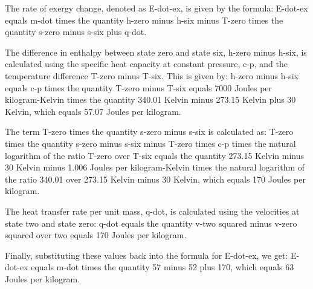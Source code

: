 The rate of exergy change, denoted as E-dot-ex, is given by the formula:
E-dot-ex equals m-dot times the quantity h-zero minus h-six minus T-zero times the quantity s-zero minus s-six plus q-dot.

The difference in enthalpy between state zero and state six, h-zero minus h-six, is calculated using the specific heat capacity at constant pressure, c-p, and the temperature difference T-zero minus T-six. This is given by:
h-zero minus h-six equals c-p times the quantity T-zero minus T-six equals 7000 Joules per kilogram-Kelvin times the quantity 340.01 Kelvin minus 273.15 Kelvin plus 30 Kelvin, which equals 57.07 Joules per kilogram.

The term T-zero times the quantity s-zero minus s-six is calculated as:
T-zero times the quantity s-zero minus s-six minus T-zero times c-p times the natural logarithm of the ratio T-zero over T-six equals the quantity 273.15 Kelvin minus 30 Kelvin minus 1.006 Joules per kilogram-Kelvin times the natural logarithm of the ratio 340.01 over 273.15 Kelvin minus 30 Kelvin, which equals 170 Joules per kilogram.

The heat transfer rate per unit mass, q-dot, is calculated using the velocities at state two and state zero:
q-dot equals the quantity v-two squared minus v-zero squared over two equals 170 Joules per kilogram.

Finally, substituting these values back into the formula for E-dot-ex, we get:
E-dot-ex equals m-dot times the quantity 57 minus 52 plus 170, which equals 63 Joules per kilogram.